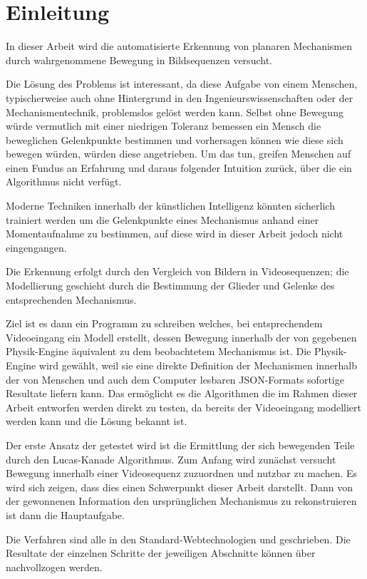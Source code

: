 %

\section{Einleitung}
\label{ch:einleitung}

In dieser Arbeit wird die automatisierte Erkennung von planaren Mechanismen durch wahrgenommene Bewegung in Bildsequenzen versucht.

Die Lösung des Problems ist interessant, da diese Aufgabe von einem Menschen, typischerweise auch ohne Hintergrund in den Ingenieurswissenschaften oder der Mechanismentechnik, problemslos gelöst werden kann.
Selbst ohne Bewegung würde vermutlich mit einer niedrigen Toleranz bemessen ein Mensch die beweglichen Gelenkpunkte bestimmen und vorhersagen können wie diese sich bewegen würden, würden diese angetrieben.
Um das tun, greifen Menschen auf einen Fundus an Erfahrung und daraus folgender Intuition zurück, über die ein Algorithmus nicht verfügt.

Moderne Techniken innerhalb der künstlichen Intelligenz könnten sicherlich trainiert werden um die Gelenkpunkte eines Mechanismus anhand einer Momentaufnahme zu bestimmen, auf diese wird in dieser Arbeit jedoch nicht eingengangen.

Die Erkennung erfolgt durch den Vergleich von Bildern in Videosequenzen; die Modellierung geschieht durch die Bestimmung der Glieder und Gelenke des entsprechenden Mechanismus.

Ziel ist es dann ein Programm zu schreiben welches, bei entsprechendem Videoeingang ein Modell erstellt, dessen Bewegung innerhalb der von  gegebenen Physik-Engine äquivalent zu dem beobachtetem Mechanismus ist.
Die  Physik-Engine wird gewählt, weil sie eine direkte Definition der Mechanismen innerhalb der von Menschen und auch dem Computer lesbaren JSON-Formats sofortige Resultate liefern kann.
Das ermöglicht es die Algorithmen die im Rahmen dieser Arbeit entworfen werden direkt zu testen, da bereits der Videoeingang modelliert werden kann und die Lösung bekannt ist.

Der erste Ansatz der getestet wird ist die Ermittlung der sich bewegenden Teile durch den Lucas-Kanade Algorithmus. %
Zum Anfang wird zunächst versucht Bewegung innerhalb einer Videosequenz zuzuordnen und nutzbar zu machen.
Es wird sich zeigen, dass dies einen Schwerpunkt dieser Arbeit darstellt.
Dann von der gewonnenen Information den ursprünglichen Mechanismus zu rekonstruieren ist dann die Hauptaufgabe.

Die Verfahren sind alle in den Standard-Webtechnologien  und  geschrieben.
Die Resultate der einzelnen Schritte der jeweiligen Abschnitte können über  nachvollzogen werden.
